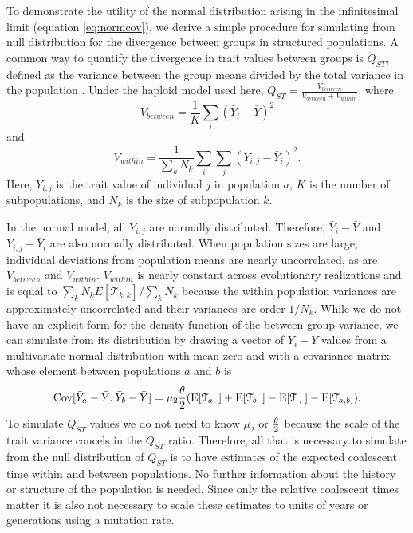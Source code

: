 To demonstrate the utility of the normal distribution arising in the
infinitesimal limit (equation \ref{eq:normcov}), we derive a simple procedure
for simulating from null distribution for the divergence between groups in
structured populations. A common way to quantify the divergence in trait values
between groups is $Q_{ST}$, defined as the variance between the group means
divided by the total variance in the population \citep{Spitze1993}. Under the
haploid model used here, $Q_{ST} = \frac{V_{between}}{V_{between} +
  V_{within}}$, where
\begin{equation*}
  V_{between} = \frac{1}{K} \sum_i \left( \bar{Y}_i - \bar{Y} \right)^2
\end{equation*}
and
\begin{equation*}
  V_{within} = \frac{1}{\sum_k N_k} \sum_i \sum_j \left( Y_{i,j} - \bar{Y}_i \right)^2.
\end{equation*}
Here, $Y_{i,j}$ is the trait value of individual $j$ in population $a$, $K$ is
the number of subpopulations, and $N_k$ is the size of subpopulation $k$.

In the normal model, all $Y_{i,j}$ are normally distributed. Therefore,
$\bar{Y}_{i} - \bar{Y}$ and $Y_{i,j} - \bar{Y}_i$ are also normally distributed.
When population sizes are large, individual deviations from population means are
nearly uncorrelated, as are $V_{between}$ and $V_{within}$. $V_{within}$ is
nearly constant across evolutionary realizations and is equal to $\sum_k N_k
E[\mathcal{T}_{k,k}] / \sum_k N_k$ because the within population variances are
approximately uncorrelated and their variances are order $1/N_k$. While we do
not have an explicit form for the density function of the between-group
variance, we can simulate from its distribution by drawing a vector of
$\bar{Y}_{i} - \bar{Y}$ values from a multivariate normal distribution with mean
zero and with a covariance matrix whose element between populations $a$ and $b$
is
\begin{equation}
  \mathrm{Cov}[\bar{Y}_{a} - \bar{Y}, \bar{Y}_{b} - \bar{Y}] =
  \mu_2 \frac{\theta}{2} (\mathrm{E}[\mathcal{T}_{a,\cdot}] + \mathrm{E}[\mathcal{T}_{b,\cdot}] -
  \mathrm{E}[\mathcal{T}_{\cdot,\cdot}] - \mathrm{E}[\mathcal{T}_{a,b}]).
\end{equation}
To simulate $Q_{ST}$ values we do not need to know $\mu_2$ or $\frac{\theta}{2}$ because the
scale of the trait variance cancels in the $Q_{ST}$ ratio. Therefore, all that
is necessary to simulate from the null distribution of $Q_{ST}$ is to have
estimates of the expected coalescent time within and between populations. No
further information about the history or structure of the population is needed.
Since only the relative coalescent times matter it is also not necessary to
scale these estimates to units of years or generations using a mutation rate.


